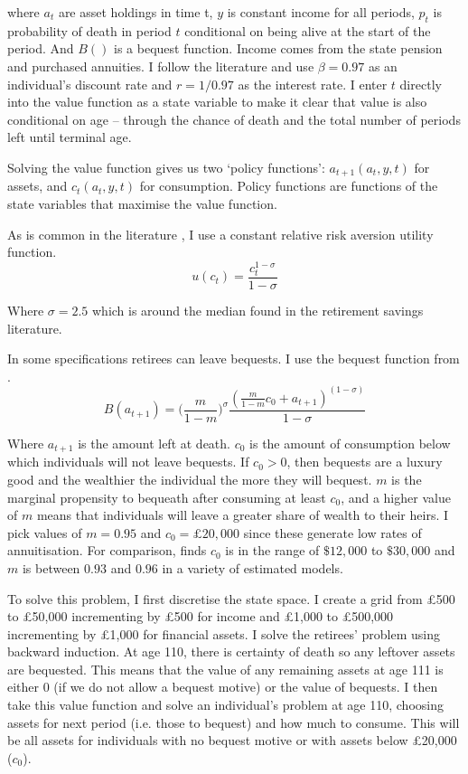 \documentclass[12pt]{article}
\begin{document}
where $a_{t}$ are asset holdings in time t, $y$ is constant income for all
periods, $p_{t}$ is probability of death in period $t$ conditional on being
alive at the start of the period. And $B()$ is a bequest function. Income comes
from the state pension and purchased annuities. I follow the literature and use
$\beta = 0.97$ as an individual's discount rate and $r = 1/0.97$ as the interest
rate. I enter $t$ directly into the value function as a state variable to make
it clear that value is also conditional on age -- through the chance of death
and the total number of periods left until terminal age.

Solving the value function gives us two `policy functions': $a_{t+1}(a_{t},
    y,t)$ for assets, and $c_{t}(a_{t}, y, t)$ for consumption. Policy
functions are functions of the state variables that maximise the value function.

As is common in the literature \citep{lockwood_red_2012,de_nardi_et_al_2010}, I
use a constant relative risk aversion utility function.
\begin{equation*}
    u(c_{t}) = \frac{c_{t}^{1 - \sigma}}{1 - \sigma}
\end{equation*}

Where $\sigma = 2.5$ which is around the median found in the retirement savings
literature.

In some specifications retirees can leave bequests. I use the bequest function
from \cite{lockwood_red_2012,lockwood_aer_2018}.
\begin{equation*}
    B(a_{t+1}) = \bigl( \frac{m}{1 - m} \bigr)^{\sigma}  \frac{(\frac{m}{1 - m}c_{0} + a_{t+1})^{(1 - \sigma)}}{1 - \sigma}
\end{equation*}

Where $a_{t+1}$ is the amount left at death. $c_{0}$ is the amount of
consumption below which individuals will not leave bequests. If $c_{0} >0$, then
bequests are a luxury good and the wealthier the individual the more they will
bequest. $m$ is the marginal propensity to bequeath after consuming at least
$c_{0}$, and a higher value of $m$ means that individuals will leave a greater
share of wealth to their heirs. I pick values of $m = 0.95$ and $c_{0} = \pounds
    20,000$ since these generate low rates of annuitisation. For comparison,
\cite{lockwood_aer_2018} finds $c_{0}$ is in the range of $\$12,000$ to
$\$30,000$ and $m$ is between $0.93$ and $0.96$ in a variety of estimated
models.

To solve this problem, I first discretise the state space. I create a grid from £500
to £50,000 incrementing by £500 for income and £1,000 to £500,000 incrementing
by £1,000 for financial assets. I solve the retirees' problem using backward
induction. At age 110, there is certainty of death so any leftover assets are
bequested. This means that the value of any remaining assets at age 111 is either 0 (if we do
not allow a bequest motive) or the value of bequests. I then take this value
function and solve an individual's problem at age 110, choosing assets for next
period (i.e. those to bequest) and how much to consume. This will be all assets
for individuals with no bequest motive or with assets below £20,000 ($c_{0}$).
\end{document}
